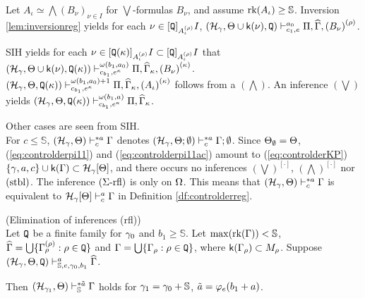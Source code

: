 \documentclass{article}
\newcommand{\mS}{\mathbb{S}}
\begin{document}
Let
$A_{\iota}\simeq\bigwedge\left(B_{\nu}\right)_{\nu\in I}$
for $\bigvee$-formulas $B_{\nu}$, and assume $\rk(A_{\iota})\geq\mS$.
Inversion \ref{lem:inversionreg} yields for each $\nu\in[{\tt Q}]_{A_{\iota}^{(\rho)}} I$,
$
(\mathcal{H}_{\gamma},\Theta\cup{\sf k}(\nu),
{\tt Q}
)\vdash^{a_{0}}_{c_{1},e}
\Pi,\widehat{\Gamma},
\left(B_{\nu}\right)^{(\rho)}
$.

SIH yields for each $\nu\in[{\tt Q}(\kappa)]_{A_{\iota}^{(\rho)}} I\subset[{\tt Q}]_{A_{\iota}^{(\rho)}} I$ that
$
(\mathcal{H}_{\gamma},\Theta\cup{\sf k}(\nu),
{\tt Q}(\kappa)
)\vdash^{\omega(b_{1},a_{0})}_{c_{b_{1}},e^{\kappa}}
\Pi,\widehat{\Gamma}_{\kappa},
\left(B_{\nu}\right)^{(\kappa)}
$.
$
(\mathcal{H}_{\gamma},\Theta,
{\tt Q}(\kappa)
)\vdash^{\omega(b_{1},a_{0})+1}_{c_{b_{1}},e^{\kappa}}
\Pi,\widehat{\Gamma}_{\kappa},
\left(A_{\iota}\right)^{(\kappa)}
$ follows from a $(\bigwedge)$.
An inference $(\bigvee)$ yields
$
(\mathcal{H}_{\gamma},\Theta,
{\tt Q}(\kappa)
)\vdash^{\omega(b_{1},a)}_{c_{b_{1}},e^{\kappa}}
\Pi,\widehat{\Gamma}_{\kappa}
$. 


Other cases are seen from SIH.
\eprf
\\

For $c\leq\mS$,
$({\cal H}_{\gamma},\Theta)\vdash^{* a}_{c}\Gamma$ denotes 
$({\cal H}_{\gamma},\Theta;\emptyset)\vdash^{*a}_{c}\Gamma;\emptyset$.
Since $\Theta_{\emptyset}=\Theta$, (\ref{eq:controlderpi11}) and (\ref{eq:controlderpi11ac}) 
amount to
(\ref{eq:controlderKP}) $\{\gamma,a,c\}\cup{\sf k}(\Gamma)\subset\mathcal{H}_{\gamma}[\Theta]$,
and there occurs no inferences $(\bigvee)^{[\cdot]}$, $(\bigwedge)^{[\cdot]}$ nor 
$({\rm stbl})$.
The inference $(\Sigma\mbox{{\rm -rfl}})$ is only on $\Omega$.
This means that $({\cal H}_{\gamma},\Theta)\vdash^{* a}_{c}\Gamma$ is equivalent to
${\cal H}_{\gamma}[\Theta]\vdash^{a}_{c}\Gamma$ in
Definition \ref{df:controlderreg}.



\blem\label{lem:sum}{\rm (Elimination of inferences (rfl))}\\
Let ${\tt Q}$ be a finite family for $\gamma_{0}$ and $b_{1}\geq\mS$.
Let
 $\max ({\rm rk}(\Gamma))<\mS$,
$\widehat{\Gamma}=\bigcup\{\Gamma_{\rho}^{(\rho)} :\rho\in{\tt Q}\}$
and
$\Gamma=\bigcup\{\Gamma_{\rho} :\rho\in{\tt Q}\}$,
where ${\sf k}(\Gamma_{\rho})\subset M_{\rho}$.
Suppose
$
(\mathcal{H}_{\gamma},\Theta,{\tt Q})
\vdash^{a}_{\mS,e,\gamma_{0},b_{1}}
\widehat{\Gamma}
$.





Then
$
(\mathcal{H}_{\gam_{1}},\Theta
)
\vdash^{* \tilde{a}}_{\mS}
\Gamma
$
holds for $\gam_{1}=\gam_{0}+\mS$, 
$\tilde{a}=\varphi_{e}(b_{1}+a)$.
\end{document}
